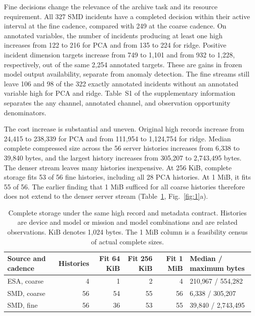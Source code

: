 \documentclass[a4paper,fleqn]{cas-dc}
\newcommand{\tabS}[1]{Table~S#1}
\begin{document}
Fine decisions change the relevance of the archive task and its resource requirement. All 327 SMD incidents have a completed decision within their active interval at the fine cadence, compared with 249 at the coarse cadence. On annotated variables, the number of incidents producing at least one high increases from 122 to 216 for PCA and from 135 to 224 for ridge. Positive incident dimension targets increase from 749 to 1{,}101 and from 932 to 1{,}228, respectively, out of the same 2{,}254 annotated targets. These are gains in frozen model output availability, separate from anomaly detection. The fine streams still leave 106 and 98 of the 322 exactly annotated incidents without an annotated variable high for PCA and ridge. \tabS{1} of the supplementary information separates the any channel, annotated channel, and observation opportunity denominators.

The cost increase is substantial and uneven. Original high records increase from 24{,}415 to 238{,}339 for PCA and from 111{,}954 to 1{,}124{,}754 for ridge. Median complete compressed size across the 56 server histories increases from 6{,}338 to 39{,}840 bytes, and the largest history increases from 305{,}207 to 2{,}743{,}495 bytes. The denser stream leaves many histories inexpensive. At 256 KiB, complete storage fits 53 of 56 fine histories, including all 28 PCA histories. At 1 MiB, it fits 55 of 56. The earlier finding that 1 MiB sufficed for all coarse histories therefore does not extend to the denser server stream (Table~\ref{tab:1}, Fig.~\ref{fig:1}a).

\begin{table}
\caption{Complete storage under the same high record and metadata contract. Histories are device and model or mission and model combinations and are related observations. KiB denotes 1{,}024 bytes. The 1 MiB column is a feasibility census of actual complete sizes.}
\label{tab:1}
\small
\begin{tabular*}{\textwidth}{@{\extracolsep{\fill}}lrrrrl@{}}
\toprule
Source and cadence & Histories & Fit 64 KiB & Fit 256 KiB & Fit 1 MiB & Median / maximum bytes \\
\midrule
ESA, coarse & 4 & 1 & 2 & 4 & 210{,}967 / 554{,}282 \\
SMD, coarse & 56 & 54 & 55 & 56 & 6{,}338 / 305{,}207 \\
SMD, fine & 56 & 36 & 53 & 55 & 39{,}840 / 2{,}743{,}495 \\
\bottomrule
\end{tabular*}
\end{table}
\end{document}
